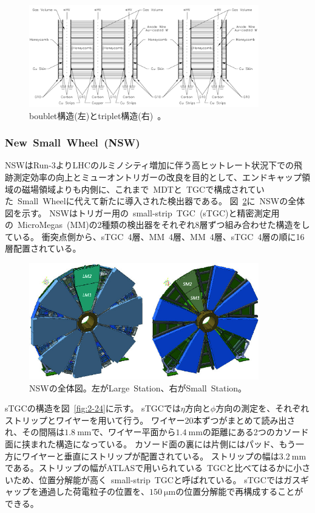 \begin{figure}[h]
  \centering
  \includegraphics[clip, width=10cm]{fig/2/TGC_construction.pdf}
  \caption{boublet構造(左)とtriplet構造(右)~\cite{Aad:1129811}。}
  \label{fig:2-22}
\end{figure}


\subsubsection{New~Small~Wheel~(NSW)}
NSWはRun-3よりLHCのルミノシティ増加に伴う高ヒットレート状況下での飛跡測定効率の向上とミューオントリガーの改良を目的として、エンドキャップ領域の磁場領域よりも内側に、これまで~MDTと~TGCで構成されていた~Small~Wheelに代えて新たに導入された検出器である。
図~\ref{fig:2-23}に~NSWの全体図を示す。
NSWはトリガー用の~small-strip~TGC~(sTGC)と精密測定用の~MicroMegas~(MM)の2種類の検出器をそれぞれ8層ずつ組み合わせた構造をしている。
衝突点側から、sTGC~4層、MM~4層、MM~4層、sTGC~4層の順に16層配置されている。

\begin{figure}[h]
  \centering
  \includegraphics[clip, width=10cm]{fig/2/NSW_structure.png}
  \caption{NSWの全体図\cite{article:ATLASNSWTDR}。左がLarge~Station、右がSmall~Station。}
  \label{fig:2-23}
\end{figure}

sTGCの構造を図~\ref{fig:2-24}に示す。
sTGCでは$\eta$方向と$\phi$方向の測定を、それぞれストリップとワイヤーを用いて行う。
ワイヤー20本ずつがまとめて読み出され、その間隔は$\SI{1.8}{\mm}$で、ワイヤー平面から$\SI{1.4}{\mm}$の距離にある2つのカソード面に挟まれた構造になっている。
カソード面の裏には片側にはパッド、もう一方にワイヤーと垂直にストリップが配置されている。
ストリップの幅は$\SI{3.2}{\mm}$である。ストリップの幅がATLASで用いられている~TGCと比べてはるかに小さいため、位置分解能が高く~small-strip~TGCと呼ばれている。
sTGCではガスギャップを通過した荷電粒子の位置を、$\SI{150}{\um}$の位置分解能で再構成することができる\cite{article:ATLASNSWTDR}。

